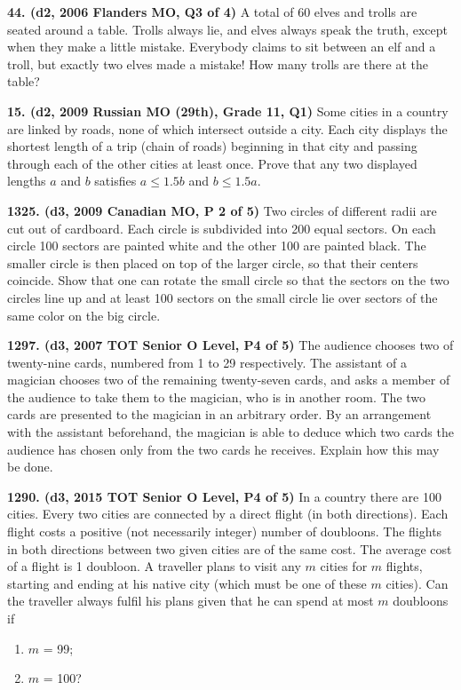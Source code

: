 \documentclass{article}
\begin{document}
        \textbf{44. (\color{red}d2\color{black}, 2006 Flanders MO, Q3 of 4)} A total of 60 elves and trolls are seated around a table. Trolls always lie, and elves always speak the truth, except when they make a little mistake. Everybody claims to sit between an elf and a troll, but exactly two elves made a mistake! How many trolls are there at the table?

        \textbf{15. (\color{red}d2\color{black}, 2009 Russian MO (29th), Grade 11, Q1)} Some cities in a country are linked by roads, none of which intersect outside a city. Each city displays the shortest length of a trip (chain of roads) beginning in that city and passing through each of the other cities at least once. Prove that any two displayed lengths $a$ and $b$ satisfies $a \leq 1.5b$ and $b \leq 1.5a.$

        \textbf{1325. (\color{red}d3\color{black}, 2009 Canadian MO, P 2 of 5)} Two circles of different radii are cut out of cardboard. Each circle is subdivided into 200 equal sectors. On each circle 100 sectors are painted white and the other
        100 are painted black. The smaller circle is then placed on top of the larger circle, so that
        their centers coincide. Show that one can rotate the small circle so that the sectors on
        the two circles line up and at least 100 sectors on the small circle lie over sectors of the
        same color on the big circle.

        \textbf{1297. (\color{red}d3\color{black}, 2007 TOT Senior O Level, P4 of 5)} The audience chooses two of twenty-nine cards, numbered from 1 to 29 respectively. The assistant of a magician chooses two of the remaining twenty-seven cards, and asks a member of the audience to take them to the magician, who is in another room. The two cards are presented to the magician in an arbitrary order. By an arrangement with the assistant beforehand, the magician is able to deduce which two cards the audience has chosen only from the two cards he receives. Explain how this may be done.

        \textbf{1290. (\color{red}d3\color{black}, 2015 TOT Senior O Level, P4 of 5)} In a country there are 100 cities. Every two cities are connected by a
        direct flight (in both directions). Each flight costs a positive (not necessarily integer)
        number of doubloons. The flights in both directions between two given cities are of
        the same cost. The average cost of a flight is 1 doubloon. A traveller plans to visit
        any $m$ cities for $m$ flights, starting and ending at his native city (which must be one
        of these $m$ cities). Can the traveller always fulfil his plans given that he can spend at
        most $m$ doubloons if
        \begin{enumerate}
                \item $m$ = 99;
                \item $m$ = 100?
        \end{enumerate}
\end{document}
